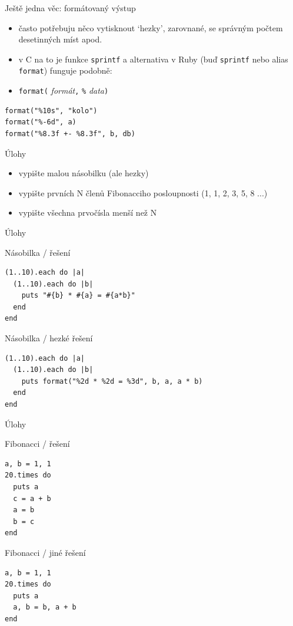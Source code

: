 \documentclass{beamer}
\begin{document}
\begin{frame}[fragile]{Ještě jedna věc: formátovaný výstup}
  \begin{itemize}
    \item často potřebuju něco vytisknout `hezky', zarovnané, se správným počtem desetinných míst apod.
    \item v C na to je funkce \texttt{sprintf} a alternativa v Ruby (buď \texttt{sprintf} nebo alias \texttt{format}) funguje podobně:
    \item \texttt{format(} \emph{formát}\texttt{,} \texttt{\%} \emph{data}\texttt{)}
  \end{itemize}
  {\small
  \begin{verbatim}
format("%10s", "kolo")
format("%-6d", a)
format("%8.3f +- %8.3f", b, db)
  \end{verbatim}
  }
\end{frame}

\begin{frame}{Úlohy}
  \begin{itemize}
    \item vypište malou násobilku (ale hezky)
    \item vypište prvních N členů Fibonacciho posloupnosti (1, 1, 2, 3, 5, 8 ...)
    \item vypište všechna prvočísla menší než N
  \end{itemize}
\end{frame}

\begin{frame}[fragile]{Úlohy}
  \begin{block}{Násobilka / řešení}
\begin{verbatim}
(1..10).each do |a|
  (1..10).each do |b|
    puts "#{b} * #{a} = #{a*b}"
  end
end
\end{verbatim}
  \end{block}
  \pause
  \begin{block}{Násobilka / hezké řešení}
\begin{verbatim}
(1..10).each do |a|
  (1..10).each do |b|
    puts format("%2d * %2d = %3d", b, a, a * b)
  end
end
\end{verbatim}
  \end{block}
\end{frame}

\begin{frame}[fragile]{Úlohy}
  \begin{block}{Fibonacci / řešení} \footnotesize
\begin{verbatim}
a, b = 1, 1
20.times do
  puts a
  c = a + b
  a = b
  b = c
end
\end{verbatim}
  \end{block}
  \begin{block}{Fibonacci / jiné řešení} \footnotesize
\begin{verbatim}
a, b = 1, 1
20.times do
  puts a
  a, b = b, a + b
end
\end{verbatim}
  \end{block}
\end{frame}
\end{document}
